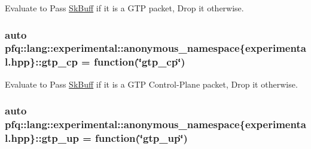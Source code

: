 Evaluate to {\ttfamily Pass} \hyperlink{structpfq_1_1lang_1_1SkBuff}{Sk\+Buff} if it is a G\+TP packet, {\ttfamily Drop} it otherwise. 

\subsubsection[{\texorpdfstring{gtp\+\_\+cp}{gtp_cp}}]{\setlength{\rightskip}{0pt plus 5cm}auto pfq\+::lang\+::experimental\+::anonymous\+\_\+namespace\{experimental.\+hpp\}\+::gtp\+\_\+cp = {\bf function}(\char`\"{}gtp\+\_\+cp\char`\"{})}\hypertarget{namespacepfq_1_1lang_1_1experimental_1_1anonymous__namespace_02experimental_8hpp_03_a209a0ce5245cb37a38e0e4c6616e3604}{}\label{namespacepfq_1_1lang_1_1experimental_1_1anonymous__namespace_02experimental_8hpp_03_a209a0ce5245cb37a38e0e4c6616e3604}


Evaluate to {\ttfamily Pass} \hyperlink{structpfq_1_1lang_1_1SkBuff}{Sk\+Buff} if it is a G\+TP Control-\/\+Plane packet, {\ttfamily Drop} it otherwise. 

\subsubsection[{\texorpdfstring{gtp\+\_\+up}{gtp_up}}]{\setlength{\rightskip}{0pt plus 5cm}auto pfq\+::lang\+::experimental\+::anonymous\+\_\+namespace\{experimental.\+hpp\}\+::gtp\+\_\+up = {\bf function}(\char`\"{}gtp\+\_\+up\char`\"{})}\hypertarget{namespacepfq_1_1lang_1_1experimental_1_1anonymous__namespace_02experimental_8hpp_03_ac8b95a754c8c3bbef4847904eaf6cb9b}{}\label{namespacepfq_1_1lang_1_1experimental_1_1anonymous__namespace_02experimental_8hpp_03_ac8b95a754c8c3bbef4847904eaf6cb9b}


